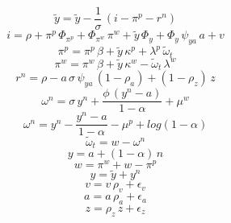 \begin{dmath}
{{\tilde{y}}}={{\tilde{y}}}-\frac{1}{{{\sigma}}}\, \left({{i}}-{{\pi^p}}-{{r^n}}\right)
\end{dmath}
\begin{dmath}
{{i}}={{\rho}}+{{\pi^p}}\, {{\Phi_{\pi^p}}}+{{\Phi_{\pi^w}}}\, {{\pi^w}}+{{\tilde{y}}}\, {{\Phi_{y}}}+{{\Phi_{y}}}\, {{\psi_{ya}}}\, {{a}}+{{v}}
\end{dmath}
\begin{dmath}
{{\pi^p}}={{\pi^p}}\, {{\beta}}+{{\tilde{y}}}\, {{\kappa^p}}+{{\lambda^p}}\, {{\tilde{\omega}_t}}
\end{dmath}
\begin{dmath}
{{\pi^w}}={{\pi^w}}\, {{\beta}}+{{\tilde{y}}}\, {{\kappa^w}}-{{\tilde{\omega}_t}}\, {{\lambda^w}}
\end{dmath}
\begin{dmath}
{{r^n}}={{\rho}}-{{a}}\, {{\sigma}}\, {{\psi_{ya}}}\, \left(1-{{\rho_a}}\right)+\left(1-{{\rho_z}}\right)\, {{z}}
\end{dmath}
\begin{dmath}
{{\omega^n}}={{\sigma}}\, {{y^n}}+\frac{{{\phi}}\, \left({{y^n}}-{{a}}\right)}{1-{{\alpha}}}+{{\mu^w}}
\end{dmath}
\begin{dmath}
{{\omega^n}}={{y^n}}-\frac{{{y^n}}-{{a}}}{1-{{\alpha}}}-{{\mu^p}}+log\left(1-{{\alpha}}\right)
\end{dmath}
\begin{dmath}
{{\tilde{\omega}_t}}={{w}}-{{\omega^n}}
\end{dmath}
\begin{dmath}
{{y}}={{a}}+\left(1-{{\alpha}}\right)\, {{n}}
\end{dmath}
\begin{dmath}
{{w}}={{\pi^w}}+{{w}}-{{\pi^p}}
\end{dmath}
\begin{dmath}
{{y}}={{\tilde{y}}}+{{y^n}}
\end{dmath}
\begin{dmath}
{{v}}={{v}}\, {{\rho_v}}+{{\epsilon_v}}
\end{dmath}
\begin{dmath}
{{a}}={{a}}\, {{\rho_a}}+{{\epsilon_a}}
\end{dmath}
\begin{dmath}
{{z}}={{\rho_z}}\, {{z}}+{{\epsilon_z}}
\end{dmath}

